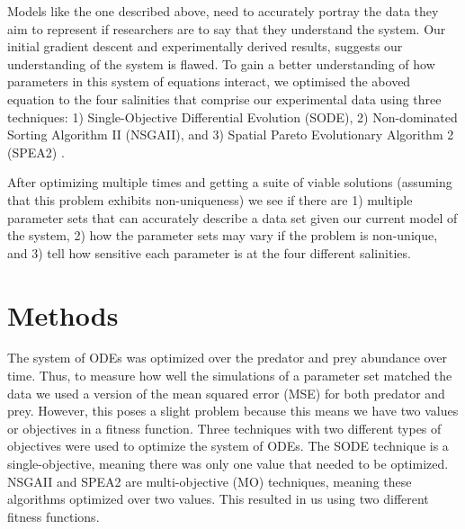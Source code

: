 \documentclass[twocolumn, 9pt]{article}
\begin{document}
\indent{} Models like the one described above, need to accurately portray the data they aim to represent if researchers are to say that they understand the system. Our initial gradient descent and experimentally derived results, suggests our understanding of the system is flawed. To gain a better understanding of how parameters in this system of equations interact, we optimised the aboved equation to the four salinities that comprise our experimental data using three techniques: 1) Single-Objective Differential Evolution (SODE), 2) Non-dominated Sorting Algorithm II (NSGAII), and 3) Spatial Pareto Evolutionary Algorithm 2 (SPEA2) \cite{deb_fast_2002, zitzler_spea2:_nodate, rocca_differential_2011}.

\indent{} After optimizing multiple times and getting a suite of viable solutions (assuming that this problem exhibits non-uniqueness) we see if there are 1) multiple parameter sets that can accurately describe a data set given our current model of the system, 2) how the parameter sets may vary if the problem is non-unique, and 3) tell how sensitive each parameter is at the four different salinities. 

\section{Methods}

\indent{} The system of ODEs was optimized over the predator and prey abundance over time. Thus, to measure how well the simulations of a parameter set matched the data we used a version of the mean squared error (MSE) for both predator and prey. However, this poses a slight problem because this means we have two values or objectives in a fitness function. Three techniques with two different types of objectives were used to optimize the system of ODEs. The SODE technique is a single-objective, meaning there was only one value that needed to be optimized. NSGAII and SPEA2 are multi-objective (MO) techniques, meaning these algorithms optimized over two values. This resulted in us using two different fitness functions. 
\end{document}
